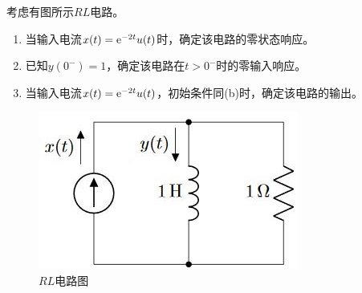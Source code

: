 \begin{proposition}

        考虑有图所示$RL$电路。

        \begin{enumerate}

            \item 当输入电流$x(t) = \mathrm{e}^{-2t}u(t)$时，确定该电路的零状态响应。
            
            \item 已知$y(0^{-}) = 1$，确定该电路在$t > 0^{-}$时的零输入响应。
            
            \item 当输入电流$x(t) =  \mathrm{e}^{-2t}u(t)$，初始条件同\textup{(b)}时，确定该电路的输出。
            
        \end{enumerate}

    \begin{figure}[H]

        \centering
        \includegraphics[scale=0.8]{RL.JPG}
        \caption{$RL$电路图}

    \end{figure}

\end{proposition}


